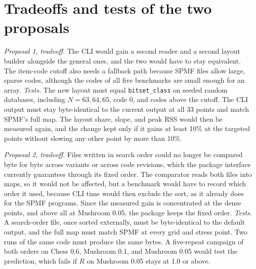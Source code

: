 \section{Tradeoffs and tests of the two proposals}
\label{app:proposals}
\emph{Proposal 1, tradeoff.} The CLI would gain a second reader and a second layout
builder alongside the general ones, and the two would have to stay equivalent. The
item-code cutoff also needs a fallback path because SPMF files allow large, sparse codes,
although the codes of all five benchmarks are small enough for an array.
\emph{Tests.} The new layout must equal \texttt{bitset\_class} on seeded random databases,
including $N = 63, 64, 65$, code 0, and codes above the cutoff. The CLI output must stay
byte-identical to the current output at all 33 points and match SPMF's full map. The
layout share, slope, and peak RSS would then be measured again, and the change kept only
if it gains at least 10\% at the targeted points without slowing any other point by more
than 10\%.

\emph{Proposal 2, tradeoff.} Files written in search order could no longer be compared
byte for byte across variants or across code revisions, which the package interface
currently guarantees through its fixed order. The comparator reads both files into maps,
so it would not be affected, but a benchmark would have to record which order it used,
because CLI time would then exclude the sort, as it already does for the SPMF programs.
Since the measured gain is concentrated at the dense points, and above all at Mushroom
0.05, the package keeps the fixed order. \emph{Tests.} A search-order file, once sorted
externally, must be byte-identical to the default output, and the full map must match
SPMF at every grid and stress point. Two runs of the same code must produce the same
bytes. A five-repeat campaign of both orders on Chess 0.6, Mushroom 0.1, and Mushroom 0.05
would test the prediction, which fails if $R$ on Mushroom 0.05 stays at 1.0 or above.

